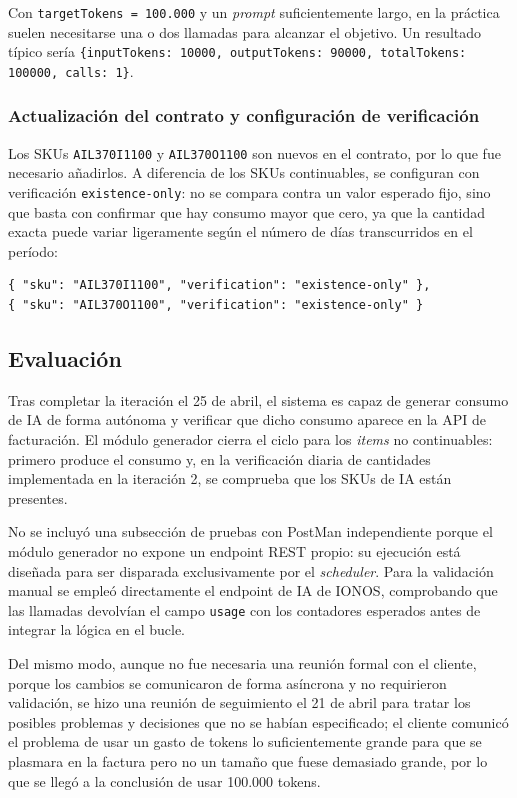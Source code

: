 Con \texttt{targetTokens = 100.000} y un \textit{prompt} suficientemente largo, en la práctica suelen necesitarse una o dos llamadas para alcanzar el objetivo. Un resultado típico sería \texttt{\{inputTokens: 10000, outputTokens: 90000, totalTokens: 100000, calls: 1\}}.

\subsubsection{Actualización del contrato y configuración de verificación}

Los SKUs \texttt{AIL370I1100} y \texttt{AIL370O1100} son nuevos en el contrato, por lo que fue necesario añadirlos. A diferencia de los SKUs continuables, se configuran con verificación \texttt{existence-only}: no se compara contra un valor esperado fijo, sino que basta con confirmar que hay consumo mayor que cero, ya que la cantidad exacta puede variar ligeramente según el número de días transcurridos en el período:

\begin{lstlisting}[caption=Configuración de los SKUs de IA en itemsToCheck, label=lst:ai-sku-config]
{ "sku": "AIL370I1100", "verification": "existence-only" },
{ "sku": "AIL370O1100", "verification": "existence-only" }
\end{lstlisting}

\subsection{Evaluación}

Tras completar la iteración el 25 de abril, el sistema es capaz de generar consumo de IA de forma autónoma y verificar que dicho consumo aparece en la API de facturación. El módulo generador cierra el ciclo para los \textit{items} no continuables: primero produce el consumo y, en la verificación diaria de cantidades implementada en la iteración 2, se comprueba que los SKUs de IA están presentes.

No se incluyó una subsección de pruebas con PostMan independiente porque el módulo generador no expone un endpoint REST propio: su ejecución está diseñada para ser disparada exclusivamente por el \textit{scheduler}. Para la validación manual se empleó directamente el endpoint de IA de IONOS, comprobando que las llamadas devolvían el campo \texttt{usage} con los contadores esperados antes de integrar la lógica en el bucle.

Del mismo modo, aunque no fue necesaria una reunión formal con el cliente, porque los cambios se comunicaron de forma asíncrona y no requirieron validación, se hizo una reunión de seguimiento el 21 de abril para tratar los posibles problemas y decisiones que no se habían especificado; el cliente comunicó el problema de usar un gasto de tokens lo suficientemente grande para que se plasmara en la factura pero no un tamaño que fuese demasiado grande, por lo que se llegó a la conclusión de usar 100.000 tokens.

